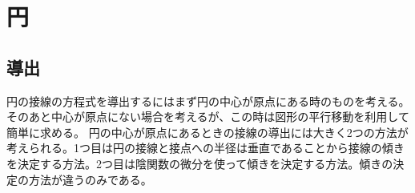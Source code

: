 

%
    \section{円}
    \subsection{導出}
    円の接線の方程式を導出するにはまず円の中心が原点にある時のものを考える。そのあと中心が原点にない場合を考えるが、この時は図形の平行移動を利用して簡単に求める。
    円の中心が原点にあるときの接線の導出には大きく2つの方法が考えられる。1つ目は円の接線と接点への半径は垂直であることから接線の傾きを決定する方法。2つ目は陰関数の微分を使って傾きを決定する方法。傾きの決定の方法が違うのみである。

